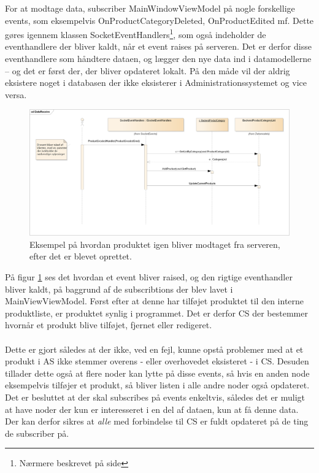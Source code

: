 For at modtage data, subscriber MainWindowViewModel på nogle forskellige events, som eksempelvis OnProductCategoryDeleted, OnProductEdited mf. Dette gøres igennem klassen SocketEventHandlers\footnote{Nærmere beskrevet på side \pageref{SocketEventHandlerBeskrivelse}}, som også indeholder de eventhandlere der bliver kaldt, når et event raises på serveren.  Det er derfor disse eventhandlere som håndtere dataen, og lægger den nye data ind i datamodellerne – og det er først der, der bliver opdateret lokalt. På den måde vil der aldrig eksistere noget i databasen der ikke eksisterer i Administrationssystemet og vice versa. 
\begin{figure}[!h]
    \centering
    \includegraphics[width=1\textwidth]{Systemdesign/backend/Images/DataReceive.png}
    \caption{Eksempel på hvordan produktet igen bliver modtaget fra serveren, efter det er blevet oprettet.}
    \label{fig:DataReceive}
\end{figure}    

På figur \ref{fig:DataReceive} ses det hvordan et event bliver raised, og den rigtige eventhandler bliver kaldt, på baggrund af de subscribtions der blev lavet i MainViewViewModel. Først efter at denne har tilføjet produktet til den interne produktliste, er produktet synlig i programmet. Det er derfor \gls{CS} der bestemmer hvornår et produkt blive tilføjet, fjernet eller redigeret.\\
\\
Dette er gjort således at der ikke, ved en fejl, kunne opstå problemer med at et produkt i \gls{AS} ikke stemmer overens - eller overhovedet eksisteret - i \gls{CS}. Desuden tillader dette også at flere noder kan lytte på disse events, så hvis en anden node eksempelvis tilføjer et produkt, så bliver listen i alle andre noder også opdateret. Det er besluttet at der skal subscribes på events enkeltvis, således det er muligt at have noder der kun er interesseret i en del af dataen, kun at få denne data. 
Der kan derfor sikres at \textit{alle} med forbindelse til \gls{CS} er fuldt opdateret på de ting de subscriber på.

